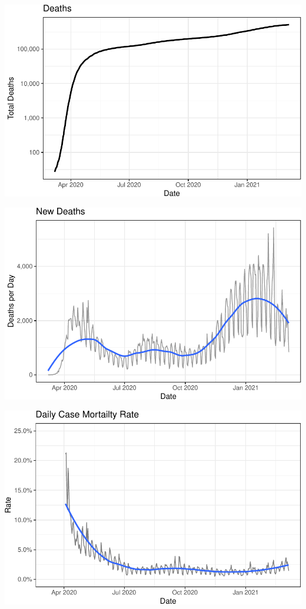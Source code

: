 \documentclass[]{article}
\begin{document}
\includegraphics{covid_files/figure-latex/unnamed-chunk-9-1.pdf}

\includegraphics{covid_files/figure-latex/unnamed-chunk-10-1.pdf}

\includegraphics{covid_files/figure-latex/unnamed-chunk-11-1.pdf}
\end{document}
